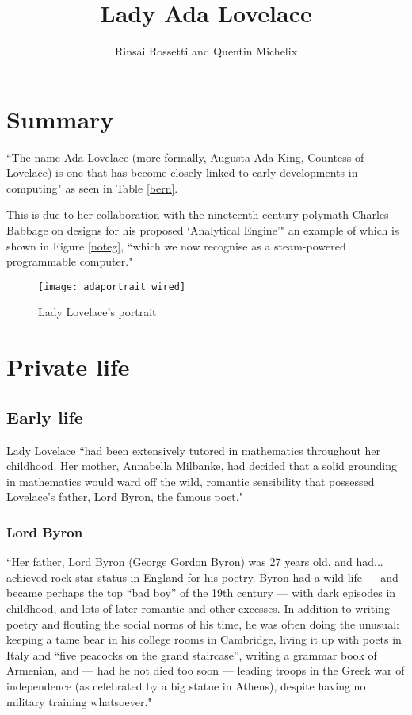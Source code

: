 \documentclass[a4paper, 12pt]{article}
\author{Rinsai Rossetti and Quentin Michelix}
\title{\vspace{-2.0cm}\textbf{Lady Ada Lovelace}}
\date{}
\begin{document}
\maketitle

\tableofcontents

\listoffigures

\listoftables

\newpage

\section{Summary}

``The name Ada Lovelace (more formally, Augusta Ada King, Countess of Lovelace) is one that has become closely linked to early developments in computing" as seen in Table \ref{bern}. 

This is due to her collaboration with the nineteenth-century polymath Charles Babbage on designs for his proposed ‘Analytical Engine’" an example of which is shown in Figure \ref{noteg}, ``which we now recognise as a steam-powered programmable computer." \cite{sciencefocus} \cite{sciencefocusadapted}

\begin{wrapfigure}{R}{0.2\textwidth}
\texttt{[image: adaportrait\_wired]}
\caption{Lady Lovelace's portrait}
\end{wrapfigure}

\section{Private life}

\subsection{Early life}

Lady Lovelace ``had been extensively tutored in mathematics throughout her childhood. Her mother, Annabella Milbanke, had decided that a solid grounding in mathematics would ward off the wild, romantic sensibility that possessed Lovelace’s father, Lord Byron, the famous poet." \cite{twobit}

\subsubsection{Lord Byron}

``Her father, Lord Byron (George Gordon Byron) was 27 years old, and had... achieved rock-star status in England for his poetry. Byron had a wild life — and became perhaps the top “bad boy” of the 19th century — with dark episodes in childhood, and lots of later romantic and other excesses. In addition to writing poetry and flouting the social norms of his time, he was often doing the unusual: keeping a tame bear in his college rooms in Cambridge, living it up with poets in Italy and “five peacocks on the grand staircase”, writing a grammar book of Armenian, and — had he not died too soon — leading troops in the Greek war of independence (as celebrated by a big statue in Athens), despite having no military training whatsoever." \cite{wired}
\end{document}
